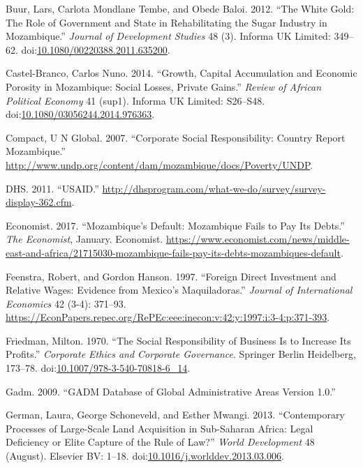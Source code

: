 \documentclass[]{article}
\begin{document}
\hypertarget{ref-Buur2012}{}
Buur, Lars, Carlota Mondlane Tembe, and Obede Baloi. 2012. ``The White
Gold: The Role of Government and State in Rehabilitating the Sugar
Industry in Mozambique.'' \emph{Journal of Development Studies} 48 (3).
Informa UK Limited: 349--62.
doi:\href{https://doi.org/10.1080/00220388.2011.635200}{10.1080/00220388.2011.635200}.

\hypertarget{ref-CastelBranco2014}{}
Castel-Branco, Carlos Nuno. 2014. ``Growth, Capital Accumulation and
Economic Porosity in Mozambique: Social Losses, Private Gains.''
\emph{Review of African Political Economy} 41 (sup1). Informa UK
Limited: S26--S48.
doi:\href{https://doi.org/10.1080/03056244.2014.976363}{10.1080/03056244.2014.976363}.

\hypertarget{ref-Compact2007}{}
Compact, U N Global. 2007. ``Corporate Social Responsibility: Country
Report Mozambique.''
\url{http://www.undp.org/content/dam/mozambique/docs/Poverty/UNDP}.

\hypertarget{ref-dhs}{}
DHS. 2011. ``USAID.''
\url{http://dhsprogram.com/what-we-do/survey/survey-display-362.cfm}.

\hypertarget{ref-Economist2017}{}
Economist. 2017. ``Mozambique's Default: Mozambique Fails to Pay Its
Debts.'' \emph{The Economist}, January. Economist.
\url{https://www.economist.com/news/middle-east-and-africa/21715030-mozambique-fails-pay-its-debts-mozambiques-default}.

\hypertarget{ref-Feenstra}{}
Feenstra, Robert, and Gordon Hanson. 1997. ``Foreign Direct Investment
and Relative Wages: Evidence from Mexico's Maquiladoras.'' \emph{Journal
of International Economics} 42 (3-4): 371--93.
\url{https://EconPapers.repec.org/RePEc:eee:inecon:v:42:y:1997:i:3-4:p:371-393}.

\hypertarget{ref-Friedman}{}
Friedman, Milton. 1970. ``The Social Responsibility of Business Is to
Increase Its Profits.'' \emph{Corporate Ethics and Corporate
Governance}. Springer Berlin Heidelberg, 173--78.
doi:\href{https://doi.org/10.1007/978-3-540-70818-6_14}{10.1007/978-3-540-70818-6\_14}.

\hypertarget{ref-gadm}{}
Gadm. 2009. ``GADM Database of Global Administrative Areas Version
1.0.''

\hypertarget{ref-German2013}{}
German, Laura, George Schoneveld, and Esther Mwangi. 2013.
``Contemporary Processes of Large-Scale Land Acquisition in Sub-Saharan
Africa: Legal Deficiency or Elite Capture of the Rule of Law?''
\emph{World Development} 48 (August). Elsevier BV: 1--18.
doi:\href{https://doi.org/10.1016/j.worlddev.2013.03.006}{10.1016/j.worlddev.2013.03.006}.
\end{document}

